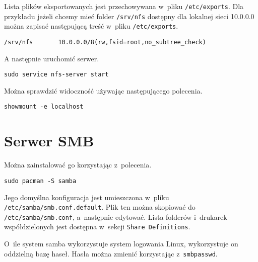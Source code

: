\documentclass[a4paper,11pt]{article}
\begin{document}
Lista plików eksportowanych jest przechowywana w~pliku \verb|/etc/exports|.
Dla przykładu jeżeli chcemy mieć folder \verb|/srv/nfs| dostępny dla lokalnej
sieci 10.0.0.0 można zapisać następującą treść w~pliku \verb|/etc/exports|.

\begin{verbatim}
/srv/nfs       10.0.0.0/8(rw,fsid=root,no_subtree_check)
\end{verbatim}

A następnie uruchomić serwer.

\begin{verbatim}
sudo service nfs-server start
\end{verbatim}

Można sprawdzić widoczność używając następującego polecenia.

\begin{verbatim}
showmount -e localhost
\end{verbatim}

\section{Serwer SMB}

Można zainstalować go korzystając z~polecenia.

\begin{verbatim}
sudo pacman -S samba
\end{verbatim}

Jego domyślna konfiguracja jest umieszczona w~pliku \verb|/etc/samba/smb.conf.default|. Plik
ten można skopiować do \verb|/etc/samba/smb.conf|, a~następnie edytować. Lista folderów
i~drukarek współdzielonych jest dostępna w~sekcji \verb|Share Definitions|.

O~ile system samba wykorzystuje system logowania Linux, wykorzystuje on oddzielną bazę haseł.
Hasła można zmienić korzystając z~\verb|smbpasswd|.
\end{document}
